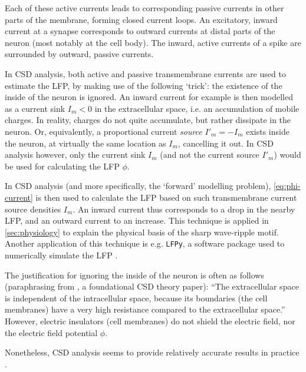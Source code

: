 Each of these active currents leads to corresponding passive currents in other parts of the membrane, forming closed current loops. An excitatory, inward current at a synapse corresponds to outward currents at distal parts of the neuron (most notably at the cell body). The inward, active currents of a spike are surrounded by outward, passive currents.

In CSD analysis, both active and passive transmembrane currents are used to estimate the LFP, by making use of the following `trick': the existence of the inside of the neuron is ignored. An inward current for example is then modelled as a current sink $I_m < 0$ in the extracellular space, i.e. an accumulation of mobile charges. In reality, charges do not quite accumulate, but rather dissipate in the neuron. Or, equivalently, a proportional current \emph{source} $I'_m = -I_m$ exists inside the neuron, at virtually the same location as $I_m$, cancelling it out. In CSD analysis however, only the current sink $I_m$ (and not the current source $I'_m$) would be used for calculating the LFP $\phi$.

In CSD analysis (and more specifically, the `forward' modelling problem), \cref{eq:phi-current} is then used to calculate the LFP based on such transmembrane current source densities $I_m$. An inward current thus corresponds to a drop in the nearby LFP, and an outward current to an increase. This technique is applied in \cref{sec:physiology} to explain the physical basis of the sharp wave-ripple motif. Another application of this technique is e.g. \texttt{LFPy}, a software package used to numerically simulate the LFP \cite{Linden2014}.

The justification for ignoring the inside of the neuron is often as follows (paraphrasing from \cite{Mitzdorf1985}, a foundational CSD theory paper): ``The extracellular space is independent of the intracellular space, because its boundaries (the cell membranes) have a very high resistance compared to the extracellular space.'' However, electric insulators (cell membranes) do not shield the electric field, nor the electric field potential $\phi$.

Nonetheless, CSD analysis seems to provide relatively accurate results in practice \cite{Bedard2011}.
